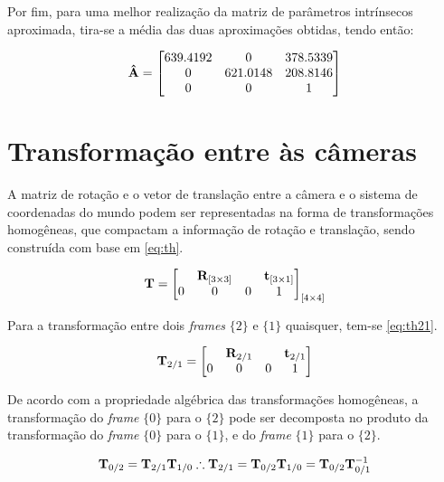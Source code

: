 Por fim, para uma melhor realização da matriz de parâmetros intrínsecos aproximada, tira-se a média das duas aproximações obtidas, tendo então:

\begin{equation}\label{eq:amed}
	\mathbf{\hat{A}} = \begin{bmatrix}
		639.4192 & 0        & 378.5339 \\
		0        & 621.0148 & 208.8146 \\
		0        & 0        & 1 		
	\end{bmatrix}
\end{equation}


\clearpage
\section{Transformação entre às câmeras}

A matriz de rotação e o vetor de translação entre a câmera e o sistema de coordenadas do mundo podem ser representadas na forma de transformações homogêneas, que compactam a informação de rotação e translação, sendo construída com base em \eqref{eq:th}.

\begin{equation}
	\mathbf{T} = \begin{bmatrix}
	&	\mathbf{R}_{[3\times 3]} & & \mathbf{t}_{[3\times 1]} \\
		0 & 0 & 0 & 1
	\end{bmatrix}_{[4\times 4]}
	\label{eq:th}
\end{equation}

Para a transformação entre dois \textit{frames} $\{2\}$ e $\{1\}$ quaisquer, tem-se \eqref{eq:th21}.

\begin{equation}
\mathbf{T}_{2/1} = \begin{bmatrix}
	& \mathbf{R}_{2/1} & & \mathbf{t}_{2/1} \\
	0 & 0 & 0 & 1
\end{bmatrix}
\label{eq:th21}
\end{equation}

De acordo com a propriedade algébrica das transformações homogêneas, a transformação do \textit{frame} $\{0\}$ para o $\{2\}$ pode ser decomposta no produto da transformação do \textit{frame} $\{0\}$ para o $\{1\}$, e do   \textit{frame} $\{1\}$ para o $\{2\}$.

\begin{equation}
	\mathbf{T}_{0/2} = \mathbf{T}_{2/1} \mathbf{T}_{1/0} \therefore \mathbf{T}_{2/1} = \mathbf{T}_{0/2} \mathbf{T}_{1/0} = \mathbf{T}_{0/2} \mathbf{T}^{-1}_{0/1}
\end{equation}

